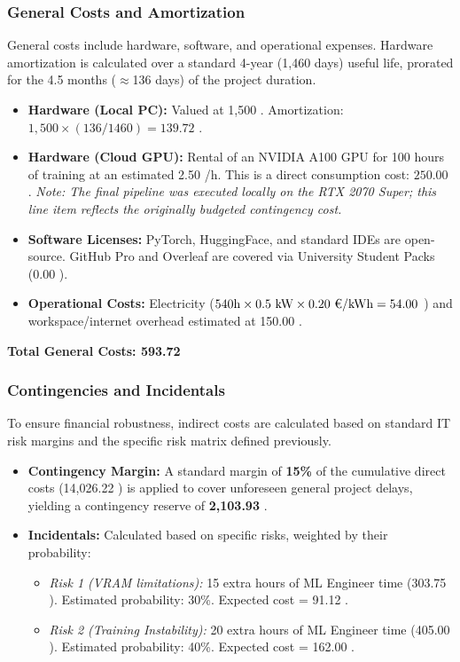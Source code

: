 \documentclass[11pt, a4paper]{article}
\begin{document}
\subsubsection*{General Costs and Amortization}
General costs include hardware, software, and operational expenses. Hardware amortization is calculated over a standard 4-year (1,460 days) useful life, prorated for the 4.5 months ($\approx$136 days) of the project duration.
\begin{itemize}
    \item \textbf{Hardware (Local PC):} Valued at 1,500 \texteuro{}. Amortization: $1,500 \times (136 / 1460) = 139.72$ \texteuro{}.
    \item \textbf{Hardware (Cloud GPU):} Rental of an NVIDIA A100 GPU for 100 hours of training at an estimated 2.50 \texteuro{}/h. This is a direct consumption cost: $250.00$ \texteuro{}. \textit{Note: The final pipeline was executed locally on the RTX 2070 Super; this line item reflects the originally budgeted contingency cost.}
    \item \textbf{Software Licenses:} PyTorch, HuggingFace, and standard IDEs are open-source. GitHub Pro and Overleaf are covered via University Student Packs (0.00 \texteuro{}).
    \item \textbf{Operational Costs:} Electricity ($540\text{h} \times 0.5\text{ kW} \times 0.20\text{ \texteuro{}/kWh} = 54.00$ \texteuro{}) and workspace/internet overhead estimated at 150.00 \texteuro{}.
\end{itemize}
\textbf{Total General Costs: 593.72 \texteuro{}}

\subsubsection*{Contingencies and Incidentals}
To ensure financial robustness, indirect costs are calculated based on standard IT risk margins and the specific risk matrix defined previously.
\begin{itemize}
    \item \textbf{Contingency Margin:} A standard margin of \textbf{15\%} of the cumulative direct costs (14,026.22 \texteuro{}) is applied to cover unforeseen general project delays, yielding a contingency reserve of \textbf{2,103.93 \texteuro{}}.
    \item \textbf{Incidentals:} Calculated based on specific risks, weighted by their probability:
    \begin{itemize}
        \item \textit{Risk 1 (VRAM limitations):} 15 extra hours of ML Engineer time (303.75 \texteuro{}). Estimated probability: 30\%. Expected cost = 91.12 \texteuro{}.
        \item \textit{Risk 2 (Training Instability):} 20 extra hours of ML Engineer time (405.00 \texteuro{}). Estimated probability: 40\%. Expected cost = 162.00 \texteuro{}.
    \end{itemize}
\end{itemize}
\end{document}
